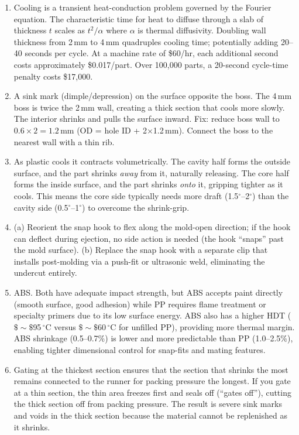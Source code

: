 \documentclass[11pt,letterpaper,twoside,openany]{book}
\providecommand{\ang}[1]{#1\ensuremath{{}^{\circ}}}
\begin{document}
\begin{enumerate}[leftmargin=1.5em]
  \item Cooling is a transient heat-conduction problem governed by the Fourier equation. The characteristic time for heat to diffuse through a slab of thickness $t$ scales as $t^2 / \alpha$ where $\alpha$ is thermal diffusivity. Doubling wall thickness from 2\,mm to 4\,mm quadruples cooling time; potentially adding 20--40 seconds per cycle. At a machine rate of \$60/hr, each additional second costs approximately \$0.017/part. Over 100,000 parts, a 20-second cycle-time penalty costs \$17,000.

  \item A sink mark (dimple/depression) on the surface opposite the boss. The 4\,mm boss is twice the 2\,mm wall, creating a thick section that cools more slowly. The interior shrinks and pulls the surface inward. Fix: reduce boss wall to $0.6 \times 2 = 1.2$\,mm (OD = hole ID + 2$\times$1.2\,mm). Connect the boss to the nearest wall with a thin rib.

  \item As plastic cools it contracts volumetrically. The cavity half forms the outside surface, and the part shrinks \emph{away} from it, naturally releasing. The core half forms the inside surface, and the part shrinks \emph{onto} it, gripping tighter as it cools. This means the core side typically needs more draft (\ang{1.5}--\ang{2}) than the cavity side (\ang{0.5}--\ang{1}) to overcome the shrink-grip.

  \item (a) Reorient the snap hook to flex along the mold-open direction; if the hook can deflect during ejection, no side action is needed (the hook ``snaps'' past the mold surface). (b) Replace the snap hook with a separate clip that installs post-molding via a push-fit or ultrasonic weld, eliminating the undercut entirely.

  \item ABS. Both have adequate impact strength, but ABS accepts paint directly (smooth surface, good adhesion) while PP requires flame treatment or specialty primers due to its low surface energy. ABS also has a higher HDT ($\$\sim\$$95\,$^{\circ}$C versus $\$\sim\$$60\,$^{\circ}$C for unfilled PP), providing more thermal margin. ABS shrinkage (0.5--0.7\%) is lower and more predictable than PP (1.0--2.5\%), enabling tighter dimensional control for snap-fits and mating features.

  \item Gating at the thickest section ensures that the section that shrinks the most remains connected to the runner for packing pressure the longest. If you gate at a thin section, the thin area freezes first and seals off (``gates off''), cutting the thick section off from packing pressure. The result is severe sink marks and voids in the thick section because the material cannot be replenished as it shrinks.


\end{enumerate}
\end{document}
